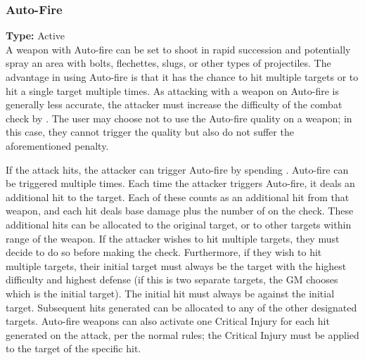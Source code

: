 \subsubsection{Auto-Fire}
\label{iqty:autofire}
\textbf{Type:} Active\\
A weapon with Auto-fire can be set to shoot in rapid
succession and potentially spray an area with bolts,
flechettes, slugs, or other types of projectiles. The
advantage in using Auto-fire is that it has the chance to hit
multiple targets or to hit a single target multiple times.
As attacking with a weapon on Auto-fire is generally
less accurate, the attacker must increase the difficulty
of the combat check by \difficulty. The user may choose not
to use the Auto-fire quality on a weapon; in this case,
they cannot trigger the quality but also do not suffer
the aforementioned penalty.

If the attack hits, the attacker can trigger Auto-fire
by spending \advantage\advantage. Auto-fire can be triggered multiple
times. Each time the attacker triggers Auto-fire, it deals
an additional hit to the target. Each of these counts as an
additional hit from that weapon, and each hit deals base
damage plus the number of \success on the check.
These additional hits can be allocated to the original
target, or to other targets within range of the weapon.
If the attacker wishes to hit multiple targets, they must
decide to do so before making the check. Furthermore, if
they wish to hit multiple targets, their initial target must
always be the target with the highest difficulty and highest
defense (if this is two separate targets, the GM chooses
which is the initial target). The initial hit must always be
against the initial target. Subsequent hits generated can
be allocated to any of the other designated targets.
Auto-fire weapons can also activate one Critical Injury for
each hit generated on the attack, per the normal rules; the
Critical Injury must be applied to the target of the specific
hit.


